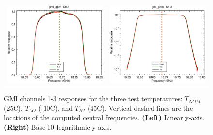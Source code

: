 \begin{figure}[H]
\begin{tabular}{c c}
    \includegraphics[scale=0.35]{graphics/lin/gmi_gpm-3.eps} &
    \includegraphics[scale=0.35]{graphics/log/gmi_gpm-3.eps}
  \end{tabular}
  \caption{GMI channels 1-3 responses for the three test temperatures: $T_{NOM}$ (25\textdegree{}C), $T_{LO}$ (-10\textdegree{}C), and $T_{HI}$ (45\textdegree{}C). Vertical dashed lines are the locations of the computed central frequencies. \textbf{(Left)} Linear y-axis. \textbf{(Right)} Base-10 logarithmic y-axis.}
  \label{fig:ch1-3_response}
\end{figure}

